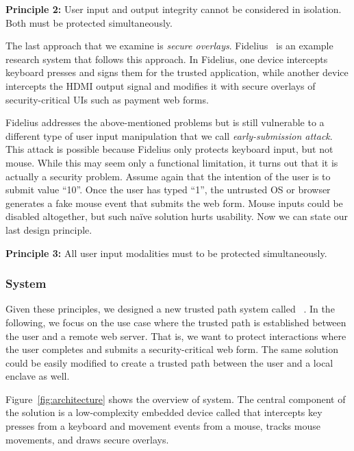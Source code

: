 \begin{tcolorbox}
\textbf{Principle 2:} User input and output integrity cannot be considered in isolation. Both must be protected simultaneously.
\end{tcolorbox}

The last approach that we examine is \emph{secure overlays}. Fidelius~\cite{Fidelius} is an example research system that follows this approach. In Fidelius, one device intercepts keyboard presses and signs them for the trusted application, while another device intercepts the HDMI output signal and modifies it with secure overlays of security-critical UIs such as payment web forms. 

Fidelius addresses the above-mentioned problems but is still vulnerable to a different type of user input manipulation that we call \emph{early-submission attack}. This attack is possible because Fidelius only protects keyboard input, but not mouse. While this may seem only a functional limitation, it turns out that it is actually a security problem. Assume again that the intention of the user is to submit value ``10''. Once the user has typed ``1'', the untrusted OS or browser generates a fake mouse event that submits the web form. Mouse inputs could be disabled altogether, but such na\"ive solution hurts usability. Now we can state our last design principle.

\begin{tcolorbox}
\textbf{Principle 3:} All user input modalities must to be protected simultaneously.
\end{tcolorbox}


\subsubsection*{\protection System}

Given these principles, we designed a new trusted path system called \protection~\cite{protection}. In the following, we focus on the use case where the trusted path is established between the user and a remote web server. That is, we want to protect interactions where the user completes and submits a security-critical web form. The same solution could be easily modified to create a trusted path between the user and a local enclave as well.

Figure~\ref{fig:architecture} shows the overview of \protection system. The central component of the solution is a low-complexity embedded device called \hub that intercepts key presses from a keyboard and movement events from a mouse, tracks mouse movements, and draws secure overlays. 


